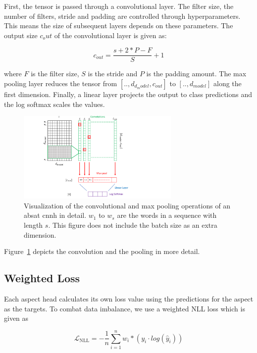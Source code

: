 First, the tensor is passed through a convolutional layer. The filter size, the number of filters, stride and padding are controlled through hyperparameters. This means the size of subsequent layers depends on these parameters. The output size $c_out$ of the convolutional layer is given as:

\begin{equation}
	c_{out} = \frac{s+2*P-F}{S} + 1
\end{equation}

where $F$ is the filter size, $S$ is the stride and $P$ is the padding amount. The max pooling layer reduces the tensor from $[.., d_{d_model}, c_{out}]$ to $[.., d_{model}]$ along the first dimension. Finally, a linear layer projects the output to class predictions and the log softmax scales the values.
\medskip

\begin{figure}[htp]
	\centering
	\includegraphics[width=0.7\textwidth]{figures/04_method/04_ch2}
	\caption{Visualization of the convolutional and max pooling operations of an \gls{absat} \gls{cnnh} in detail. $w_1$ to $w_s$ are the words in a sequence with length $s$. This figure does not include the batch size as an extra dimension.}
	\label{fig:04_ch2}
\end{figure}

Figure~\ref{fig:04_ch2} depicts the convolution and the pooling in more detail.

\subsection{Weighted Loss}

Each aspect head calculates its own loss value using the predictions for the aspect as the targets. To combat data imbalance, we use a weighted NLL loss which is given as

\begin{equation}
\mathcal{L}_\text{NLL}=-\frac{1}{n}\sum_{i=1}^{n} w_i * (y_i \cdot log(\hat{y}_i))
\label{eq:04_nll}
\end{equation}

